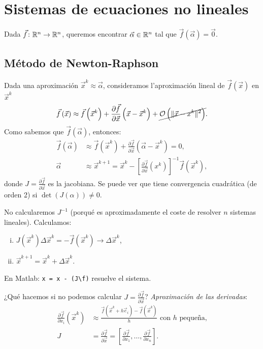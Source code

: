 \chapter{Sistemas de ecuaciones no lineales}

\noindent Dada $\vec{f} \colon \mathbb{R}^n \to \mathbb{R}^n$, queremos encontrar $\vec{\alpha} \in \mathbb{R}^n$ tal que $\vec{f}\left( \vec{\alpha} \right) = \vec{0}$.

\section{M\'etodo de Newton-Raphson}

\noindent Dada una aproximaci\'on $\vec{x}^k \approx \vec{\alpha}$, consideramos l'aproximaci\'on lineal de $\vec{f}\left( \vec{x} \right)$ en $\vec{x}^k$
\[
    \vec{f}\left( \vec{x} \right) \approx \vec{f}\left( \vec{x}^k \right) + \frac{\partial \vec{f}}{\partial \vec{x}}\left( \vec{x}-\vec{x}^k \right) + \cancel{\mathcal{O} \left( \| \vec{x}-x^k\|^2 \right)}.
\]
Como sabemos que $\vec{f} \left( \vec{\alpha} \right)$, entonces:
\begin{align*}
    \vec{f}\left( \vec{\alpha} \right) &\approx \vec{f}\left( \vec{x}^k \right) + \frac{\partial \vec{f}}{\partial \vec{x}}\left( \vec{\alpha}-\vec{x}^k \right) = 0, \\
    \vec{\alpha} &\approx \vec{x}^{k+1} = \vec{x}^k - \left[ \frac{\partial\vec{f}}{\partial\vec{x}}\left( x^k \right) \right]^{-1} \vec{f}\left( \vec{x}^k \right),
\end{align*}
donde $J = \frac{\partial\vec{f}}{\partial \vec{x}}$ es la jacobiana. Se puede ver que tiene convergencia cuadr\'atica (de orden 2) si $\det\left( J(\alpha) \right) \neq 0$.

\begin{obs}
    No calcularemos $J^{-1}$ (porqu\'e es aproximadamente el coste de resolver $n$ sistemas lineales). Calculamos:
    \begin{enumerate}[i)]
        \item $J\left( \vec{x}^k \right)\Delta \vec{x}^k = -\vec{f}\left( \vec{x}^k \right) \longrightarrow \Delta \vec{x}^k$,
        \item $\vec{x}^{k+1} = \vec{x}^k + \Delta\vec{x}^k$.
    \end{enumerate}
    En Matlab: \texttt{x = x - (J\textbackslash f)} resuelve el sistema.
\end{obs}

\noindent ¿Qu\'e hacemos si no podemos calcular $J = \frac{\partial \vec{f}}{\partial \vec{x}}$?
\emph{Aproximaci\'on de las derivadas}:
\begin{align*}
    \frac{\partial \vec{f}}{\partial x_i}\left( \vec{x}^k \right) &\approx \frac{\vec{f}\left( \vec{x}^k + h\vec{e}_i \right) - \vec{f}\left( \vec{x}^k \right)}{h} \text{ con } h \text{ pequeña,} \\
    J &= \frac{\partial \vec{f}}{\partial \vec{x}} = \left[ \frac{\partial \vec{f}}{\partial x_1}, \dots, \frac{\partial \vec{f}}{\partial x_n} \right].
\end{align*}


